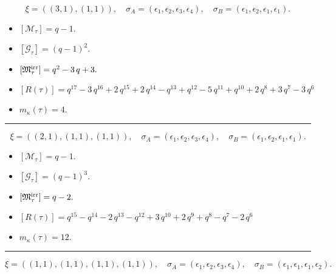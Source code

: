 \documentclass[10pt,a4paper]{amsart}
\begin{document}
$$\xi = ({(3, 1)}, {(1, 1)}),\quad \sigma_A = ({{\epsilon_1, \epsilon_2, \epsilon_3}}, {{\epsilon_4}}),\quad \sigma_B = ({{\epsilon_1, \epsilon_2, \epsilon_1}}, {{\epsilon_1}}).$$

\begin{itemize}
 \item $[\mathcal{M}_{\tau}] = q - 1 .$

 \item $[\mathcal{G}_{\tau}] = {\left(q - 1\right)}^{2} .$

 \item $[{\frak M}_{\tau}^{\textrm{irr}}] = q^{2} - 3 \, q + 3 .$

 \item $[R(\tau)] = q^{17} - 3 \, q^{16} + 2 \, q^{15} + 2 \, q^{14} - q^{13} + q^{12} - 5 \, q^{11} + q^{10} + 2 \, q^{8} + 3 \, q^{7} - 3 \, q^{6} $

 \item $m_{\kappa}(\tau) = 4 .$

 \end{itemize}
\noindent\rule{8cm}{0.4pt}

$$\xi = ({(2, 1), (1, 1)}, {(1, 1)}),\quad \sigma_A = ({{\epsilon_1, \epsilon_2}, {\epsilon_3}}, {{\epsilon_4}}),\quad \sigma_B = ({{\epsilon_1, \epsilon_2}, {\epsilon_1}}, {{\epsilon_1}}).$$

\begin{itemize}
 \item $[\mathcal{M}_{\tau}] = q - 1 .$

 \item $[\mathcal{G}_{\tau}] = {\left(q - 1\right)}^{3} .$

 \item $[{\frak M}_{\tau}^{\textrm{irr}}] = q - 2 .$

 \item $[R(\tau)] = q^{15} - q^{14} - 2 \, q^{13} - q^{12} + 3 \, q^{10} + 2 \, q^{9} + q^{8} - q^{7} - 2 \, q^{6} $

 \item $m_{\kappa}(\tau) = 12 .$

 \end{itemize}
\noindent\rule{8cm}{0.4pt}

$$\xi = ({(1, 1), (1, 1), (1, 1)}, {(1, 1)}),\quad \sigma_A = ({{\epsilon_1}, {\epsilon_2}, {\epsilon_3}}, {{\epsilon_4}}),\quad \sigma_B = ({{\epsilon_1}, {\epsilon_1}, {\epsilon_1}}, {{\epsilon_2}}).$$
\end{document}
